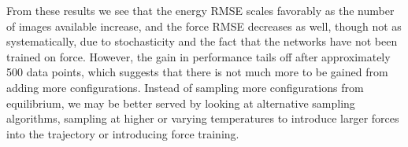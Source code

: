 From these results we see that the energy RMSE scales favorably as
the number of images available increase, and the force RMSE decreases
as well, though not as systematically, due to stochasticity and
the fact that the networks have not been trained on force.
However, the gain in performance tails off after approximately 500 data points,
which suggests that there is not much more to be gained from
adding more configurations.
Instead of sampling more configurations from equilibrium, we may
be better served by looking at alternative sampling algorithms,
sampling at higher or varying temperatures to introduce larger
forces into the trajectory or introducing force training.
